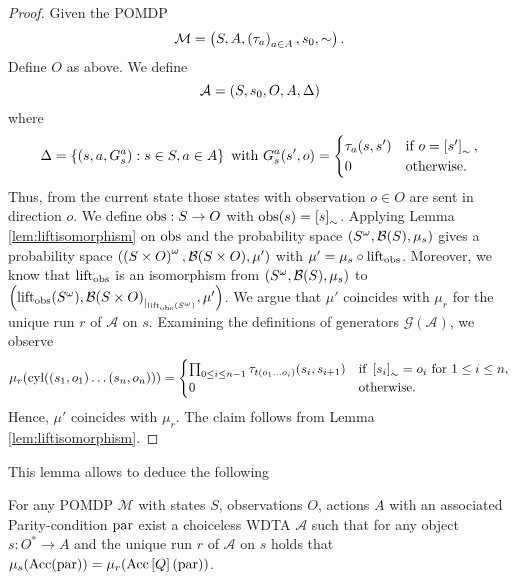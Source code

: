 \begin{proof}
  Given the \ac{POMDP}
  \begin{equation*}
    \mathcal{M} = \left(S, A, \left(\tau_{a}\right)_{a\in A}, s_{0}, \sim\right).
  \end{equation*}
  Define $O$ as above. We define
  \begin{equation*}
    \mathcal{A} = \left(S, s_{0}, O, A, \Delta\right)
  \end{equation*}
  where
  \begin{equation*}
    \Delta = \left\{\left(s, a, G_{s}^{a}\right):s\in S,a\in A\right\}\text{ with }
    G_{s}^{a}(s', o) = \begin{cases}
      \tau_{a}(s, s')&\text{if }o = \left[s'\right]_{\sim},\\
      0              &\text{otherwise.}
    \end{cases}
  \end{equation*}
  Thus, from the current state those states with observation $o\in O$ are sent
  in direction $o$. We define $\operatorname{obs}:S\rightarrow O$ with
  $\operatorname{obs}(s) = \left[s\right]_{\sim}$. Applying Lemma \ref{lem:liftisomorphism}
  on $\operatorname{obs}$ and the probability space $\left(S^{\omega}, \mathcal{B}(S),
  \mu_{s}\right)$ gives a probability space $\left(\left(S\times O\right)^{\omega},
  \mathcal{B}(S\times O), \mu'\right)$ with $\mu' = \mu_{s}\circ\operatorname{lift}_{\operatorname{obs}}$.
  Moreover, we know that $\operatorname{lift}_{\operatorname{obs}}$ is an isomorphism from
  $\left(S^{\omega}, \mathcal{B}(S), \mu_{s}\right)$ to
  $\left(\operatorname{lift}_{\operatorname{obs}}(S^{\omega}),
    {\mathcal{B}(S\times O)}_{|_{\operatorname{lift}_{\operatorname{obs}}(S^{\omega})}}, \mu'\right)$.
  We argue that $\mu'$ coincides with $\mu_{r}$ for the unique run $r$ of
  $\mathcal{A}$ on $s$. Examining the definitions of generators
  $\mathcal{G}(\mathcal{A})$, we observe
  \begin{equation}
    \mu_{r}(\operatorname{cyl}(\left(s_{1},o_{1}\right)\dots\left(s_{n},o_{n}\right))) =
    \begin{cases}
      \prod_{0\leq i\leq n-1}\tau_{t(o_{1}\dots o_{i})}(s_{i}, s_{i+1})
        &\text{if }\left[s_{i}\right]_{\sim} = o_{i}\text{ for }1\leq i\leq n,\\
      0 &\text{otherwise}.
    \end{cases}
    \label{eq:wdtapomdp}
  \end{equation}
  Hence, $\mu'$ coincides with $\mu_{r}$. The claim follows from Lemma
  \ref{lem:liftisomorphism}.
\end{proof}
This lemma allows to deduce the following
\begin{theorem}
  For any \ac{POMDP} $\mathcal{M}$ with states $S$, observations $O$, actions
  $A$ with an associated Parity-condition $\operatorname{par}$ exist a choiceless
  \ac{WDTA} $\mathcal{A}$ such that for any object $s:O^{*}\rightarrow A$ and
  the unique run $r$ of $\mathcal{A}$ on $s$ holds that
  $\mu_{s}(\operatorname{Acc}(\operatorname{par})) = \mu_{r}(\operatorname{Acc}\left[Q\right](\operatorname{par}))$.
  \label{thm:POMDPequivWDTA}
\end{theorem}

